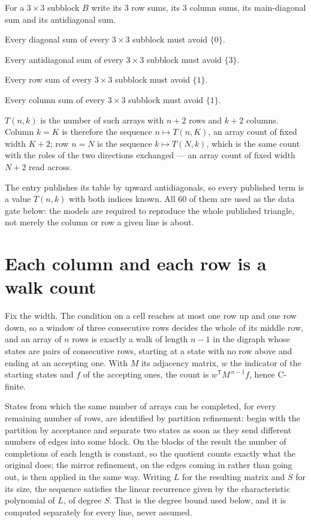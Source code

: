 \documentclass[11pt]{article}
\theoremstyle{definition}
\begin{document}
For a $3\times3$ subblock $B$ write its 3 row sums, its 3 column sums, its main-diagonal sum and its antidiagonal sum.

Every diagonal sum of every $3\times3$ subblock must avoid $\{0\}$.

Every antidiagonal sum of every $3\times3$ subblock must avoid $\{3\}$.

Every row sum of every $3\times3$ subblock must avoid $\{1\}$.

Every column sum of every $3\times3$ subblock must avoid $\{1\}$.

$T(n,k)$ is the number of such arrays with $n + 2$ rows and $k + 2$ columns. Column $k = K$ is therefore the sequence $n \mapsto T(n,K)$, an array count of fixed width $K + 2$; row $n = N$ is the sequence $k \mapsto T(N,k)$, which is the same count with the roles of the two directions exchanged --- an array count of fixed width $N + 2$ read across.

The entry publishes its table by upward antidiagonals, so every published term is a value $T(n,k)$ with both indices known. All 60 of them are used as the data gate below: the models are required to reproduce the whole published triangle, not merely the column or row a given line is about.

\section{Each column and each row is a walk count}

Fix the width. The condition on a cell reaches at most one row up and one row down, so a window of three consecutive rows decides the whole of its middle row, and an array of $n$ rows is exactly a walk of length $n-1$ in the digraph whose states are pairs of consecutive rows, starting at a state with no row above and ending at an accepting one. With $M$ its adjacency matrix, $w$ the indicator of the starting states and $f$ of the accepting ones, the count is $w^{\mathsf T}M^{\,n-1}f$, hence C-finite.

States from which the same number of arrays can be completed, for every remaining number of rows, are identified by partition refinement: begin with the partition by acceptance and separate two states as soon as they send different numbers of edges into some block. On the blocks of the result the number of completions of each length is constant, so the quotient counts exactly what the original does; the mirror refinement, on the edges coming in rather than going out, is then applied in the same way. Writing $L$ for the resulting matrix and $S$ for its size, the sequence satisfies the linear recurrence given by the characteristic polynomial of $L$, of degree $S$. That is the degree bound used below, and it is computed separately for every line, never assumed.
\end{document}

